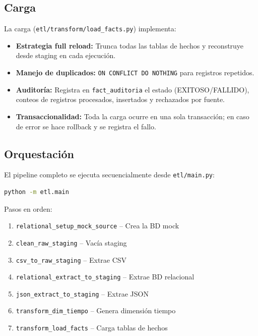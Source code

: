 \documentclass[12pt, letterpaper]{article}
\begin{document}
\subsection{Carga}

La carga (\texttt{etl/transform/load\_facts.py}) implementa:

\begin{itemize}
  \item \textbf{Estrategia full reload:} Trunca todas las tablas de hechos y reconstruye desde staging en cada ejecución.
  \item \textbf{Manejo de duplicados:} \texttt{ON CONFLICT DO NOTHING} para registros repetidos.
  \item \textbf{Auditoría:} Registra en \texttt{fact\_auditoria} el estado (EXITOSO/FALLIDO), conteos de registros procesados, insertados y rechazados por fuente.
  \item \textbf{Transaccionalidad:} Toda la carga ocurre en una sola transacción; en caso de error se hace rollback y se registra el fallo.
\end{itemize}

\subsection{Orquestación}

El pipeline completo se ejecuta secuencialmente desde \texttt{etl/main.py}:

\begin{lstlisting}[language=bash]
python -m etl.main
\end{lstlisting}

Pasos en orden:
\begin{enumerate}
  \item \texttt{relational\_setup\_mock\_source} -- Crea la BD mock
  \item \texttt{clean\_raw\_staging} -- Vacía staging
  \item \texttt{csv\_to\_raw\_staging} -- Extrae CSV
  \item \texttt{relational\_extract\_to\_staging} -- Extrae BD relacional
  \item \texttt{json\_extract\_to\_staging} -- Extrae JSON
  \item \texttt{transform\_dim\_tiempo} -- Genera dimensión tiempo
  \item \texttt{transform\_load\_facts} -- Carga tablas de hechos
\end{enumerate}

\end{document}
